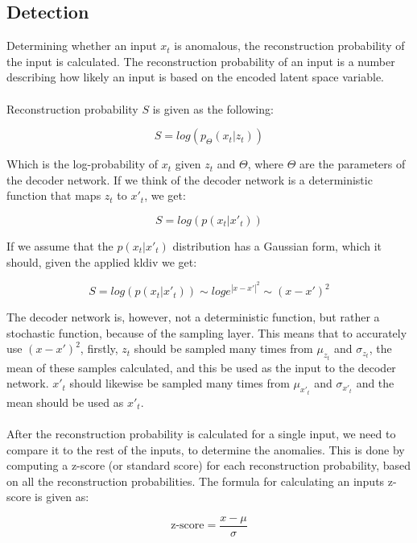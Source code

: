 \subsection{Detection}
Determining whether an input $x_t$ is anomalous, the reconstruction probability of the input is calculated. The reconstruction probability of an input is a number describing how likely an input is based on the encoded latent space variable.
\\\\
Reconstruction probability $S$ is given as the following:

\begin{equation}
    S = log(p_\Theta(x_t | z_{t}))
\end{equation}

\noindent
Which is the log-probability of $x_t$ given $z_t$ and $\Theta$, where $\Theta$ are the parameters of the decoder network. If we think of the decoder network is a deterministic function that maps $z_t$ to $x'_t$, we get:

\begin{equation}
    S = log(p(x_t | x'_t))
\end{equation}

\noindent
If we assume that the $p(x_t | x'_t)$ distribution has a Gaussian form, which it should, given the applied \gls{kldiv} we get:

\begin{equation}
    S = log(p(x_t | x'_t)) \sim log e^{|x-x'|^2} \sim (x - x')^2
\end{equation}

\noindent
The decoder network is, however, not a deterministic function, but rather a stochastic function, because of the sampling layer. This means that to accurately use $(x - x')^2$, firstly, $z_t$ should be sampled many times from $\mu_{z_t}$ and $\sigma_{z_t}$, the mean of these samples calculated, and this be used as the input to the decoder network. $x'_t$ should likewise be sampled many times from $\mu_{x'_t}$ and $\sigma_{x'_t}$ and the mean should be used as $x'_t$.
\\\\
After the reconstruction probability is calculated for a single input, we need to compare it to the rest of the inputs, to determine the anomalies. This is done by computing a z-score (or standard score) for each reconstruction probability, based on all the reconstruction probabilities. The formula for calculating an inputs z-score is given as:

\begin{equation}
    \text{z-score} = \frac{x - \mu}{\sigma} 
\end{equation}

